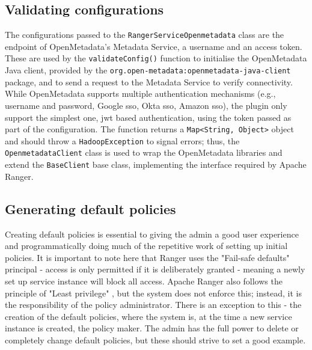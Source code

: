 \subsection{Validating configurations}

The configurations passed to the \texttt{RangerServiceOpenmetadata} class are the endpoint of OpenMetadata's Metadata Service, a username and an access token. These are used by the \texttt{validateConfig()} function to initialise the OpenMetadata Java client, provided by the \texttt{org.open-metadata:openmetadata-java-client} package, and to send a request to the Metadata Service to verify connectivity. While OpenMetadata supports multiple authentication mechanisms (e.g., username and password, Google \acrshort{sso}, Okta \acrshort{sso}, Amazon \acrshort{sso}), the plugin only support the simplest one, \acrshort{jwt} based authentication, using the token passed as part of the configuration. The function returns a \texttt{Map<String, Object>} object and should throw a \texttt{HadoopException} to signal errors; thus, the \texttt{OpenmetadataClient} class is used to wrap the OpenMetadata libraries and extend the \texttt{BaseClient} base class, implementing the interface required by Apache Ranger.

\subsection{Generating default policies}

Creating default policies is essential to giving the admin a good user experience and programmatically doing much of the repetitive work of setting up initial policies.
It is important to note here that Ranger uses the "Fail-safe defaults" principal \cite{protectionOfInformationInComputerSystemsSaltzer1975} - access is only permitted if it is deliberately granted - meaning a newly set up service instance will block all access. Apache Ranger also follows the principle of "Least privilege" \cite{protectionOfInformationInComputerSystemsSaltzer1975}, but the system does not enforce this; instead, it is the responsibility of the policy administrator. There is an exception to this - the creation of the default policies, where the system is, at the time a new service instance is created, the policy maker. The admin has the full power to delete or completely change default policies, but these should strive to set a good example.

